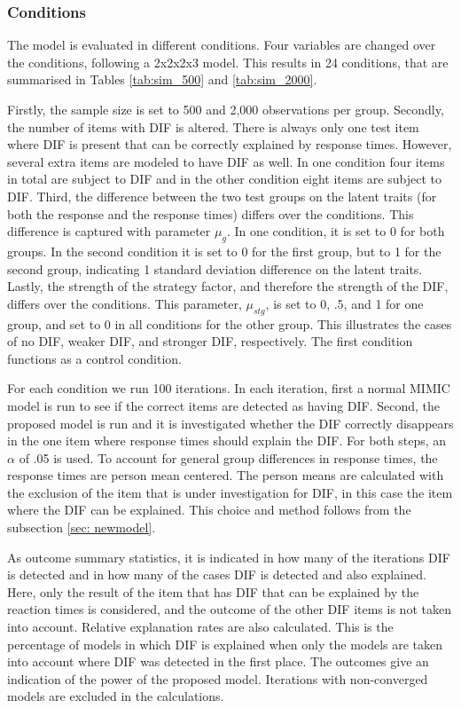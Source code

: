 \documentclass{interact}
\begin{document}
\subsubsection{Conditions}
The model is evaluated in different conditions. Four variables are changed over the conditions, following a 2x2x2x3 model. This results in 24 conditions, that are summarised in Tables \ref{tab:sim_500} and \ref{tab:sim_2000}.

Firstly, the sample size is set to 500 and 2,000 observations per group. Secondly, the number of items with DIF is altered. There is always only one test item where DIF is present that can be correctly explained by response times. However, several extra items are modeled to have DIF as well. In one condition four items in total are subject to DIF and in the other condition eight items are subject to DIF. Third, the difference between the two test groups on the latent traits (for both the response and the response times) differs over the conditions. This difference is captured with parameter $\mu_g$. In one condition, it is set to 0 for both groups. In the second condition it is set to 0 for the first group, but to 1 for the second group, indicating 1 standard deviation difference on the latent traits. Lastly, the strength of the strategy factor, and therefore the strength of the DIF, differs over the conditions. This parameter, $\mu_{stg}$, is set to 0, .5, and 1 for one group, and set to 0 in all conditions for the other group. This illustrates the cases of no DIF, weaker DIF, and stronger DIF, respectively. The first condition functions as a control condition.

For each condition we run 100 iterations. In each iteration, first a normal MIMIC model is run to see if the correct items are detected as having DIF. Second, the proposed model is run and it is investigated whether the DIF correctly disappears in the one item where response times should explain the DIF. For both steps, an $\alpha$ of .05 is used. To account for general group differences in response times, the response times are person mean centered. The person means are calculated with the exclusion of the item that is under investigation for DIF, in this case the item where the DIF can be explained. This choice and method follows from the subsection \ref{sec: newmodel}.

As outcome summary statistics, it is indicated in how many of the iterations DIF is detected and in how many of the cases DIF is detected and also explained. Here, only the result of the item that has DIF that can be explained by the reaction times is considered, and the outcome of the other DIF items is not taken into account. Relative explanation rates are also calculated. This is the percentage of models in which DIF is explained when only the models are taken into account where DIF was detected in the first place. The outcomes give an indication of the power of the proposed model. Iterations with non-converged models are excluded in the calculations.
\end{document}
